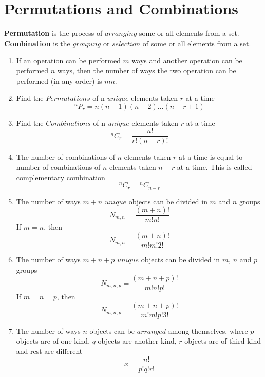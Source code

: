 \documentclass[a4paper]{book}
\begin{document}
\section{Permutations and Combinations}
\textbf{Permutation} is the process of $arranging$ some or all elements from a set. \textbf{Combination} is the $grouping$ or $selection$ of some or all elements from a set. 
\begin{enumerate}
\item If an operation can be performed $m$ ways and another operation can be performed $n$ ways, then the number of ways the two operation can be performed (in any order) is $mn$.
\item Find the $Permutations$ of n $unique$ elements taken $r$ at a time
\begin{equation}
^{n}P_{r} = n(n - 1)(n - 2)...(n - r + 1)
\end{equation}
\item Find the $Combinations$ of n $unique$ elements taken $r$ at a time
\begin{equation}
^{n}C_{r} = \frac{n!}{r!(n - r)!}
\end{equation}
\item The number of combinations of $n$ elements taken $r$ at a time is equal to number of combinations of $n$ elements taken $n - r$ at a time. This is called complementary combination
\begin{equation}
^{n}C_{r} = {}^{n}C_{n - r}
\end{equation}
\item The number of ways $m + n$ $unique$ objects can be divided in $m$ and $n$ groups
\begin{equation}
N_{m,n} = \frac{(m + n)!}{m!n!}
\end{equation}
If $m = n$, then
\begin{equation}
N_{m,n} = \frac{(m + n)!}{m!m!2!}
\end{equation}
\item The number of ways $m + n + p$ $unique$ objects can be divided in $m$, $n$ and $p$ groups
\begin{equation}
N_{m,n,p} = \frac{(m + n + p)!}{m!n!p!}
\end{equation}
If $m = n = p$, then
\begin{equation}
N_{m,n,p} = \frac{(m + n + p)!}{m!m!p!3!}
\end{equation}
\item The number of ways $n$ objects can be $arranged$ among themselves, where $p$ objects are of one kind, $q$ objects are another kind, $r$ objects are of third kind and rest are different 
\begin{equation}
x = \frac{n!}{p!q!r!}
\end{equation}
\end{enumerate}
\end{document}
